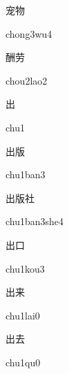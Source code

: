 \begin{multicols*}{2}
\begin{verbete}[chong3wu4]{宠物}
\begin{pronuncia}{chong3wu4}
\end{pronuncia}
\end{verbete}

\begin{verbete}{酬劳}
\begin{pronuncia}{chou2lao2}
\end{pronuncia}
\end{verbete}

\begin{verbete}[chu1]{出}
\begin{pronuncia}{chu1}
\end{pronuncia}
\end{verbete}

\begin{verbete}{出版}
\begin{pronuncia}{chu1ban3}
\end{pronuncia}
\end{verbete}

\begin{verbete}{出版社}
\begin{pronuncia}{chu1ban3she4}
\end{pronuncia}
\end{verbete}

\begin{verbete}{出口}
\begin{pronuncia}{chu1kou3}
\end{pronuncia}
\end{verbete}

\begin{verbete}[chu1qu0]{出来}
\begin{pronuncia}{chu1lai0}
\end{pronuncia}
\end{verbete}

\begin{verbete}[chu1qu0]{出去}
\begin{pronuncia}{chu1qu0}
\end{pronuncia}
\end{verbete}


\end{multicols*}
